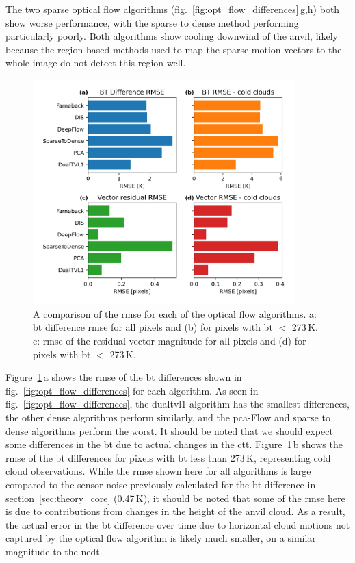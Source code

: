 The two sparse optical flow algorithms (fig.~\ref{fig:opt_flow_differences}\,g,h) both show worse performance, with the sparse to dense method performing particularly poorly.
Both algorithms show cooling downwind of the anvil, likely because the region-based methods used to map the sparse motion vectors to the whole image do not detect this region well.

\begin{figure}[tp]
    \includegraphics[width=0.9\textwidth]{figures/chapter1_12.png}
    \caption[
    A comparison of the \acrshort{bt} difference and residual vector magnitude \acrshort{rmse} for each of the optical flow algorithms
    ]{
    A comparison of the \acrshort{rmse} for each of the optical flow algorithms. a: \acrshort{bt} difference \acrshort{rmse} for all pixels and (b) for pixels with \acrshort{bt} $<$ 273\,\unit{K}. c: \acrshort{rmse} of the residual vector magnitude for all pixels and (d) for pixels with \acrshort{bt} $<$ 273\,\unit{K}.
    }
    \label{fig:opt_flow_mse}
\end{figure}

Figure~\ref{fig:opt_flow_mse}\,a shows the \acrfull{rmse} of the \acrshort{bt} differences shown in fig.~\ref{fig:opt_flow_differences} for each algorithm.
As seen in fig.~\ref{fig:opt_flow_differences}, the \acrshort{dualtvl1} algorithm has the smallest differences, the other dense algorithms perform similarly, and the \acrshort{pca}-Flow and sparse to dense algorithms perform the worst.
It should be noted that we should expect some differences in the \acrshort{bt} due to actual changes in the \acrshort{ctt}.
Figure~\ref{fig:opt_flow_mse}\,b shows the \acrshort{rmse} of the \acrshort{bt} differences for pixels with \acrshort{bt} less than 273\,\unit{K}, representing cold cloud observations.
While the \acrshort{rmse} shown here for all algorithms is large compared to the sensor noise previously calculated for the \acrshort{bt} difference in section~\ref{sec:theory_core} (0.47\,K), it should be noted that some of the \acrshort{rmse} here is due to contributions from changes in the height of the anvil cloud.
As a result, the actual error in the \acrshort{bt} difference over time due to horizontal cloud motions not captured by the optical flow algorithm is likely much smaller, on a similar magnitude to the \acrshort{nedt}.

